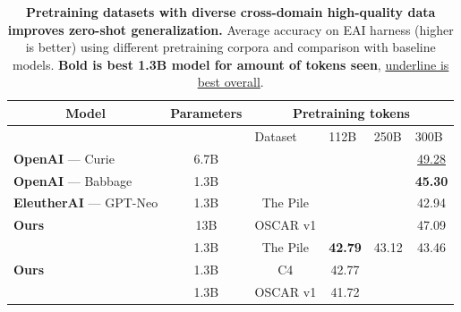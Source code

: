 \documentclass[11pt]{article}
\begin{document}
\begin{table}[t]
\begin{center}
\begin{tabular}{@{}lccccc@{}}
\toprule
\multicolumn{1}{c}{\textbf{Model}} & \textbf{Parameters}            & \multicolumn{4}{c}{\textbf{Pretraining tokens}}                                                                       \\ \midrule
                                               & \multicolumn{1}{l}{}  & \multicolumn{1}{l}{Dataset} & \multicolumn{1}{l}{112B} & \multicolumn{1}{l}{250B} & \multicolumn{1}{l}{300B} \\ \midrule
\textbf{OpenAI} --- Curie          & 6.7B            & \multicolumn{1}{l}{}        &                          &                          & \underline{49.28}           \\
\textbf{OpenAI} --- Babbage          & 1.3B            & \multicolumn{1}{l}{}        &                          &                          & \textbf{45.30}        \\
\textbf{EleutherAI} --- GPT-Neo              & 1.3B                  & The Pile                    &                          &                          & 42.94                    \\ \midrule
\multirow{1}{*}{\textbf{Ours}}                             & 13B                   & OSCAR v1                      &                          &                          & 47.09                    \\ \midrule
    \multirow{3}{*}{\textbf{Ours}}                                                        & 1.3B & The Pile                    & \textbf{42.79}                    & 43.12                    & 43.46                    \\
                                                           & 1.3B & C4                          & 42.77                    &                          &                          \\
                                                           & 1.3B & OSCAR v1                       & 41.72           &                          &                          \\ \bottomrule
\end{tabular}
\end{center}
\caption{\textbf{Pretraining datasets with diverse cross-domain high-quality data improves zero-shot generalization.} Average accuracy on EAI harness (higher is better) using different pretraining corpora and comparison with baseline models. \textbf{Bold is best 1.3B model for amount of tokens seen}, \underline{underline is best overall}.}
\label{tab:validation}
\end{table}
\end{document}
